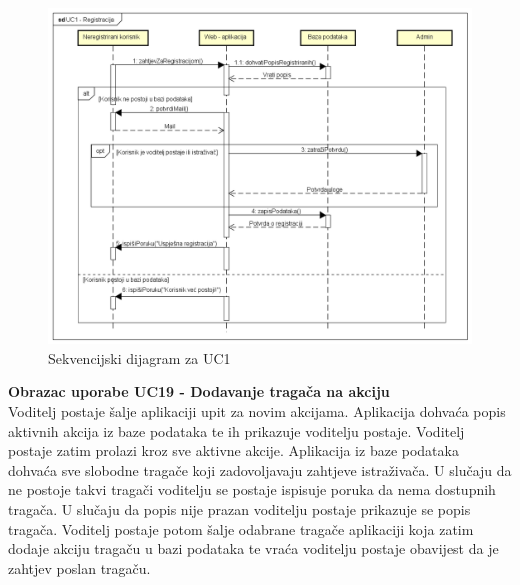 				
				
				\begin{figure}[H]
					\includegraphics[scale=0.5]{slike/UC1 - Registracija.png} %
					\centering
					\caption{Sekvencijski dijagram za UC1}
					\label{fig:UC1 - Registracija}
				\end{figure}

				\eject

				\noindent
				\textbf{Obrazac uporabe UC19 - Dodavanje tragača na akciju}\\

				\noindent
				Voditelj postaje šalje aplikaciji upit za novim akcijama.
        			Aplikacija dohvaća popis aktivnih akcija iz baze podataka te ih prikazuje voditelju postaje.
        			Voditelj postaje zatim prolazi kroz sve aktivne akcije.
        			Aplikacija iz baze podataka dohvaća sve slobodne tragače koji zadovoljavaju zahtjeve istraživača.
        			U slučaju da ne postoje takvi tragači voditelju se postaje ispisuje poruka da nema dostupnih tragača.
        			U slučaju da popis nije prazan voditelju postaje prikazuje se popis tragača.
        			Voditelj postaje potom šalje odabrane tragače aplikaciji koja zatim dodaje akciju tragaču u bazi podataka te
        			vraća voditelju postaje obavijest da je zahtjev poslan tragaču.

				


